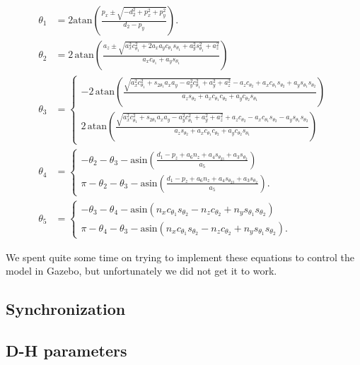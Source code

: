 \documentclass[11pt,a4paper, titlepage]{article}
\begin{document}
	\begin{align*}
\theta_1 &= 2\mathrm{atan}\left(\frac{p_x \pm \sqrt{-d_2^2 + p_x^2 +p_y^2}}{d_2 - p_y}\right). \\[10pt]
\theta_2 &= 2\,\mathrm{atan}\left(\frac{a_z \pm \sqrt{a_x^2c_{\theta_1}^2+2a_xa_yc_{\theta_1}s_{\theta_1}+a_y^2s_{\theta_1}^2+a_z^2}}{a_xc_{\theta_1} + a_ys_{\theta_1}}\right) \\[10pt]
\theta_3 &= 
\begin{cases}
-2\,\mathrm{atan}\left(\frac{\sqrt{a_x^2c_{\theta_1}^2 + s_{2\theta_1}a_xa_y-a_y^2c_{\theta_1}^2 + a_y^2 + a_z^2} - a_zc_{\theta_2}+a_xc_{\theta_1}s_{\theta_2}+a_ys_{\theta_1}s_{\theta_2}}{a_zs_{\theta_2} + a_xc_{\theta_1}c_{\theta_2} + a_yc_{\theta_2}s_{\theta_1}}\right) \\[10pt]
2\,\mathrm{atan}\left(\frac{\sqrt{a_x^2c_{\theta_1}^2 + s_{2\theta_1}a_xa_y-a_y^2c_{\theta_1}^2 + a_y^2 + a_z^2} + a_zc_{\theta_2} - a_xc_{\theta_1}s_{\theta_2} - a_ys_{\theta_1}s_{\theta_2}}{a_zs_{\theta_2} + a_xc_{\theta_1}c_{\theta_2} + a_yc_{\theta_2}s_{\theta_1}}\right)
\end{cases} \\[10pt]
\theta_4 &= \begin{cases}
-\theta_2 - \theta_3 - \mathrm{asin}\left(\frac{d_1 - p_z + a_6n_z + a_4s_{\theta_{23}} + a_3s_{\theta_2}}{a_5}\right) \\[5pt]
\pi -\theta_2 - \theta_3 - \mathrm{asin}\left(\frac{d_1 - p_z + a_6n_z + a_4s_{\theta_{23}} + a_3s_{\theta_2}}{a_5}\right).
\end{cases} \\[10pt]
\theta_5 &= 
\begin{cases}
-\theta_3 - \theta_4 - \mathrm{asin}(n_xc_{\theta_1}s_{\theta_2} - n_zc_{\theta_2} + n_ys_{\theta_1}s_{\theta_2}) \\[5pt]
\pi - \theta_4 - \theta_3 - \mathrm{asin}(n_xc_{\theta_1}s_{\theta_2} - n_zc_{\theta_2} + n_ys_{\theta_1}s_{\theta_2}).
\end{cases}
\end{align*}

We spent quite some time on trying to implement these equations to control the model in Gazebo, but unfortunately we did not get it to work. 
	
	\subsection{Synchronization}
	
	\subsection{D-H parameters}
	
\end{document}
